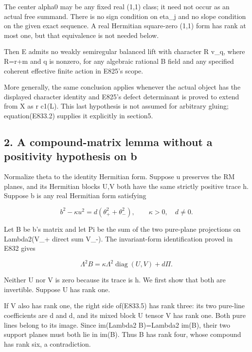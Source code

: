The center alpha0 may be any fixed real (1,1) class; it need not occur
as an actual free summand. There is no sign condition on eta\_j and no
slope condition on the given exact sequence. A real Hermitian
square-zero (1,1) form has rank at most one, but that equivalence is not
needed below.

Then E admits no weakly semiregular balanced lift with character R v\_q,
where R=r+m and q is nonzero, for any algebraic rational B field and any
specified coherent effective finite action in E825's scope.

More generally, the same conclusion applies whenever the actual object
has the displayed character identity and E825's defect determinant is
proved to extend from X as r c1(L). This last hypothesis is not assumed
for arbitrary gluing; equation(E833.2) supplies it explicitly in
section5.

\subsection{2. A compound-matrix lemma without a positivity hypothesis
on
b}\label{SF-E833:a-compound-matrix-lemma-without-a-positivity-hypothesis-on-b}

Normalize theta to the identity Hermitian form. Suppose u preserves the
RM planes, and its Hermitian blocks U,V both have the same strictly
positive trace h. Suppose b is any real Hermitian form satisfying

\[
 b^2-\kappa u^2=d(\theta_+^2+\theta_-^2),
 \qquad \kappa>0,\quad d\ne0.
 \tag{E833.4}
\]

Let B be b's matrix and let Pi be the sum of the two pure-plane
projections on Lambda2(V\_+ direct sum V\_-). The invariant-form
identification proved in E832 gives

\[
 \Lambda^2B=\kappa\Lambda^2\operatorname{diag}(U,V)+d\Pi.
 \tag{E833.5}
\]

Neither U nor V is zero because its trace is h. We first show that both
are invertible. Suppose U has rank one.

If V also has rank one, the right side of(E833.5) has rank three: its
two pure-line coefficients are d and d, and its mixed block U tensor V
has rank one. Both pure lines belong to its image. Since im(Lambda2
B)=Lambda2 im(B), their two support planes must both lie in im(B). Thus
B has rank four, whose compound has rank six, a contradiction.

